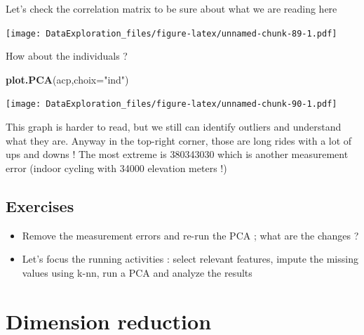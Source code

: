 \documentclass[
]{book}
\newenvironment{Shaded}{\begin{snugshade}}{\end{snugshade}}
\newcommand{\DataTypeTok}[1]{\textcolor[rgb]{0.13,0.29,0.53}{#1}}
\newcommand{\KeywordTok}[1]{\textcolor[rgb]{0.13,0.29,0.53}{\textbf{#1}}}
\newcommand{\NormalTok}[1]{#1}
\newcommand{\OperatorTok}[1]{\textcolor[rgb]{0.81,0.36,0.00}{\textbf{#1}}}
\newcommand{\StringTok}[1]{\textcolor[rgb]{0.31,0.60,0.02}{#1}}
\providecommand{\tightlist}{%
  \setlength{\itemsep}{0pt}\setlength{\parskip}{0pt}}
\begin{document}
Let's check the correlation matrix to be sure about what we are reading here

\begin{Shaded}
\end{Shaded}

\texttt{[image: DataExploration\_files/figure-latex/unnamed-chunk-89-1.pdf]}

How about the individuals ?

\begin{Shaded}
\begin{Highlighting}[]
\KeywordTok{plot.PCA}\NormalTok{(acp,}\DataTypeTok{choix=}\StringTok{"ind"}\NormalTok{)}
\end{Highlighting}
\end{Shaded}

\texttt{[image: DataExploration\_files/figure-latex/unnamed-chunk-90-1.pdf]}

This graph is harder to read, but we still can identify outliers and understand what they are. Anyway in the top-right corner, those are long rides with a lot of ups and downs ! The most extreme is 380343030 which is another measurement error (indoor cycling with 34000 elevation meters !)

\hypertarget{exercises}{%
\subsection{Exercises}\label{exercises}}

\begin{itemize}
\tightlist
\item
  Remove the measurement errors and re-run the PCA ; what are the changes ?
\item
  Let's focus the running activities : select relevant features, impute the missing values using k-nn, run a PCA and analyze the results
\end{itemize}

\hypertarget{dimension-reduction}{%
\section{Dimension reduction}\label{dimension-reduction}}
\end{document}
